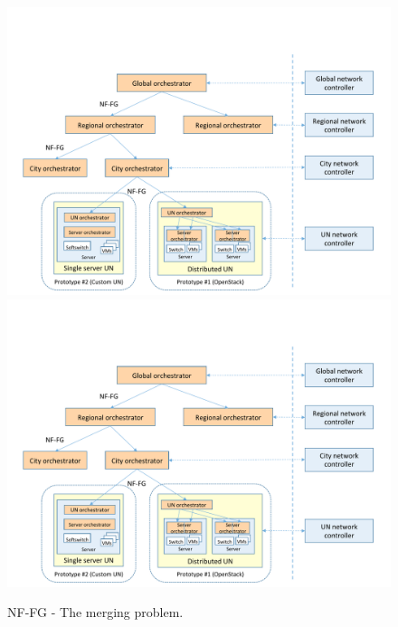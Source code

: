 \begin{figure}[h]
	\centering
	\includegraphics[clip= true, width= \columnwidth, trim= 0cm 0.2cm 0cm 0cm, page= 38]{images/Pictures_definitivo.pdf}
	\includegraphics[clip= true, width= \columnwidth, trim= 0cm 10cm 0cm 0.2cm, page= 39]{images/Pictures_definitivo.pdf}
	\caption{NF-FG - The merging problem.}
	\label{fig:NF-FG_the_merging_problem_2}
\end{figure}


